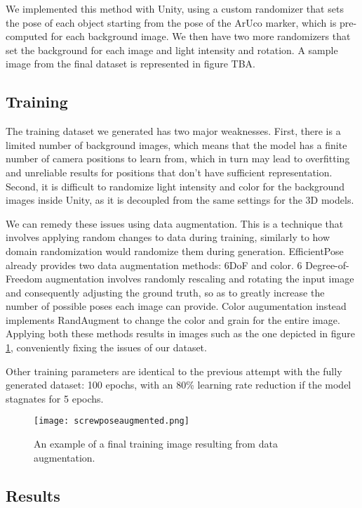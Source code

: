 We implemented this method with Unity, using a custom randomizer that sets the pose of each object starting from the pose of the ArUco marker, which is pre-computed for each background image. We then have two more randomizers that set the background for each image and light intensity and rotation. A sample image from the final dataset is represented in figure TBA.

\subsection{Training}

The training dataset we generated has two major weaknesses. First, there is a limited number of background images, which means that the model has a finite number of camera positions to learn from, which in turn may lead to overfitting and unreliable results for positions that don't have sufficient representation. Second, it is difficult to randomize light intensity and color for the background images inside Unity, as it is decoupled from the same settings for the 3D models.

We can remedy these issues using data augmentation. This is a technique that involves applying random changes to data during training, similarly to how domain randomization would randomize them during generation. EfficientPose already provides two data augmentation methods: 6DoF and color. 6 Degree-of-Freedom augmentation involves randomly rescaling and rotating the input image and consequently adjusting the ground truth, so as to greatly increase the number of possible poses each image can provide. Color augumentation instead implements RandAugment\cite{RandAugment} to change the color and grain for the entire image. Applying both these methods results in images such as the one depicted in figure \ref{fig:ScrewPoseAugmented}, conveniently fixing the issues of our dataset.

Other training parameters are identical to the previous attempt with the fully generated dataset: 100 epochs, with an 80\% learning rate reduction if the model stagnates for 5 epochs.

\begin{figure}
    \texttt{[image: screwposeaugmented.png]}
    \caption{An example of a final training image resulting from data augmentation.}
    \label{fig:ScrewPoseAugmented}
\end{figure}

\subsection{Results}

